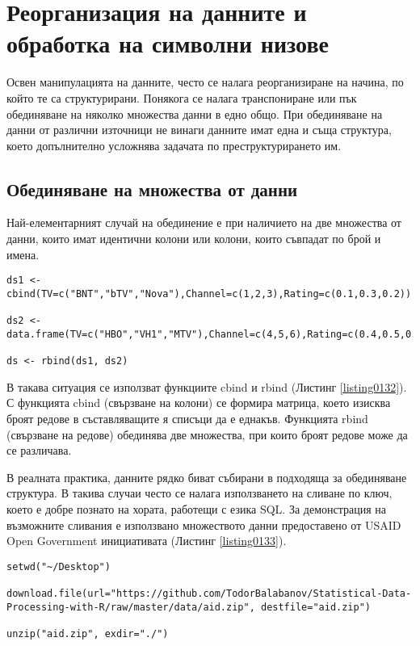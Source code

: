 \newpage
\chapter{Реорганизация на данните и обработка на символни низове}
\label{chapter07}
\thispagestyle{empty}

Освен манипулацията на данните, често се налага реорганизиране на начина, по който те са структурирани. Понякога се налага транспониране или пък обединяване на няколко множества данни в едно общо. При обединяване на данни от различни източници не винаги данните имат една и съща структура, което допълнително усложнява задачата по преструктурирането им.

\section{Обединяване на множества от данни}

Най-елементарният случай на обединение е при наличието на две множества от данни, които имат идентични колони или колони, които съвпадат по брой и имена.

\begin{lstlisting}[caption=Обединяване на множества от данни, label=listing0132]
ds1 <- cbind(TV=c("BNT","bTV","Nova"),Channel=c(1,2,3),Rating=c(0.1,0.3,0.2))

ds2 <- data.frame(TV=c("HBO","VH1","MTV"),Channel=c(4,5,6),Rating=c(0.4,0.5,0.6),stringsAsFactors=FALSE)

ds <- rbind(ds1, ds2)
\end{lstlisting}

В такава ситуация се използват функциите cbind и rbind (Листинг \ref{listing0132}). С функцията cbind (свързване на колони) се формира матрица, което изисква броят редове в съставляващите я списъци да е еднакъв. Функцията rbind (свързване на редове) обединява две множества, при които броят редове може да се различава.

В реалната практика, данните рядко биват събирани в подходяща за обединяване структура. В такива случаи често се налага използването на сливане по ключ, което е добре познато на хората, работещи с езика SQL. За демонстрация на възможните сливания е използвано множеството данни предоставено от USAID Open Government инициативата (Листинг \ref{listing0133}).

\begin{lstlisting}[caption=USAID множество от данни, label=listing0133]
setwd("~/Desktop")

download.file(url="https://github.com/TodorBalabanov/Statistical-Data-Processing-with-R/raw/master/data/aid.zip", destfile="aid.zip")

unzip("aid.zip", exdir="./")
\end{lstlisting}

